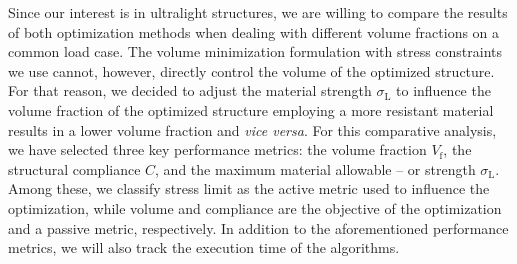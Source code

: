 Since our interest is in ultralight structures, we are willing to compare the results of both optimization methods when dealing with different volume fractions on a common load case. The volume minimization formulation with stress constraints we use cannot, however, directly control the volume of the optimized structure. For that reason, we decided to adjust the material strength $\sigma_\text{L}$ to influence the volume fraction of the optimized structure \ie employing a more resistant material results in a lower volume fraction and \textit{vice versa}. For this comparative analysis, we have selected three key performance metrics: the volume fraction $V_\text{f}$, the structural compliance $C$, and the maximum material allowable -- or strength $\sigma_\text{L}$. Among these, we classify stress limit as the active metric used to influence the optimization, while volume and compliance are the objective of the optimization and a passive metric, respectively. In addition to the aforementioned performance metrics, we will also track the execution time of the algorithms.

